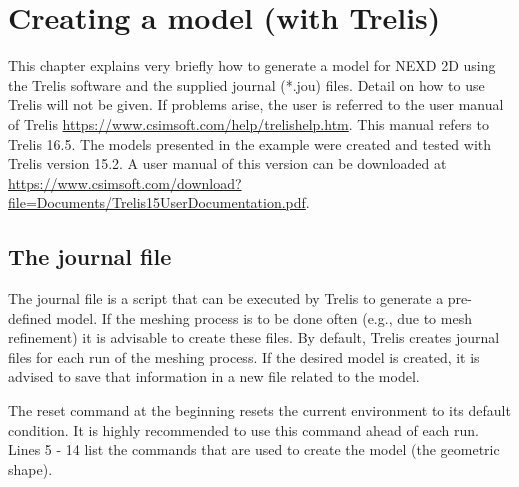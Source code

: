 \chapter{Creating a model (with Trelis)}
\label{chap:model}
	This chapter explains very briefly how to generate a model for NEXD 2D using the Trelis software and the supplied journal (*.jou) files. Detail on how to use Trelis will not be given. If problems arise, the user is referred to the user manual of Trelis \url{https://www.csimsoft.com/help/trelishelp.htm}. This manual refers to Trelis 16.5. The models presented in the example were created and tested with Trelis version 15.2. A user manual of this version can be downloaded at \url{https://www.csimsoft.com/download?file=Documents/Trelis15UserDocumentation.pdf}. 
	\section{The journal file}
	\label{sec:jou}
		The journal file is a script that can be executed by Trelis to generate a pre-defined model. If the meshing process is to be done often (e.g., due to mesh refinement) it is advisable to create these files. By default, Trelis creates journal files for each run of the meshing process. If the desired model is created, it is advised to save that information in a new file related to the model.   
		
		
    
    	The reset command at the beginning resets the current environment to its default condition. It is highly recommended to use this command ahead of each run.
    	Lines 5 - 14 list the commands that are used to create the model (the geometric shape). \\		
    	  	
    	 \\
    	
